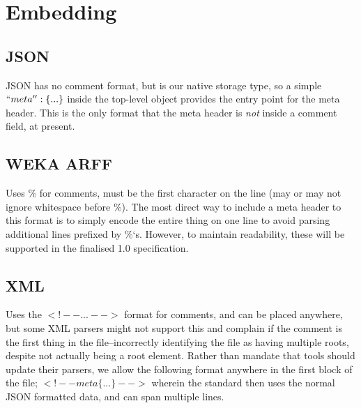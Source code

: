 \section{Embedding}

\subsection{JSON}
JSON has no comment format, but is our native storage type, so a simple $``meta'':\{ ... \}$ inside the top-level object provides the entry point for the meta header.
This is the only format that the meta header is \textit{not} inside a comment field, at present.

\subsection{WEKA ARFF}
Uses \% for comments, must be the first character on the line (may or may not ignore whitespace before \%).
The most direct way to include a meta header to this format is to simply encode the entire thing on one line to avoid parsing additional lines prefixed by \%`s.
However, to maintain readability, these will be supported in the finalised 1.0 specification.

\subsection{XML}
Uses the $<!-- ... -->$ format for comments, and can be placed anywhere, but some XML parsers might not support this and complain if the comment is the first thing in the file--incorrectly identifying the file as having multiple roots, despite not actually being a root element.
Rather than mandate that tools should update their parsers, we allow the following format anywhere in the first block of the file; $<!-- meta \{ ... \} -->$ wherein the standard then uses the normal JSON formatted data, and can span multiple lines.

